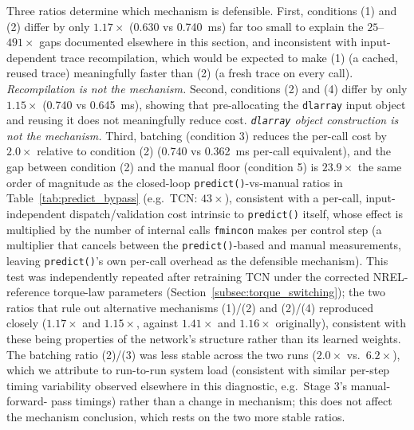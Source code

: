 Three ratios determine which mechanism is defensible. First,
conditions (1) and (2) differ by only $1.17\times$ (\SI{0.630}{} vs
\SI{0.740}{ms})  far too small to explain the $25$--$491\times$
gaps documented elsewhere in this section, and inconsistent with
input-dependent trace recompilation, which would be expected to make
(1) (a cached, reused trace) meaningfully faster than (2) (a fresh
trace on every call). \emph{Recompilation is not the mechanism.}
Second, conditions (2) and (4) differ by only $1.15\times$
(\SI{0.740}{} vs \SI{0.645}{ms}), showing that pre-allocating the
\texttt{dlarray} input object and reusing it does not meaningfully
reduce cost. \emph{\texttt{dlarray} object construction is not the
mechanism.} Third, batching (condition 3) reduces the per-call cost
by $2.0\times$ relative to condition (2) (\SI{0.740}{} vs
\SI{0.362}{ms} per-call equivalent), and the gap between condition (2)
and the manual floor (condition 5) is $23.9\times$  the same order
of magnitude as the closed-loop \texttt{predict()}-vs-manual ratios in
Table~\ref{tab:predict_bypass} (e.g.\ TCN: $43\times$), consistent
with a per-call, input-independent dispatch/validation cost intrinsic
to \texttt{predict()} itself, whose effect is multiplied by the number
of internal calls \texttt{fmincon} makes per control step (a
multiplier that cancels between the \texttt{predict()}-based and
manual measurements, leaving \texttt{predict()}'s own per-call
overhead as the defensible mechanism). This test was independently
repeated after retraining TCN under the corrected NREL-reference
torque-law parameters (Section~\ref{subsec:torque_switching}); the
two ratios that rule out alternative mechanisms (1)/(2) and (2)/(4)
reproduced closely ($1.17\times$ and $1.15\times$, against $1.41\times$
and $1.16\times$ originally), consistent with these being properties
of the network's structure rather than its learned weights. The
batching ratio (2)/(3) was less stable across the two runs
($2.0\times$ vs.\ $6.2\times$), which we attribute to run-to-run
system load (consistent with similar per-step timing variability
observed elsewhere in this diagnostic, e.g.\ Stage 3's manual-forward-
pass timings) rather than a change in mechanism; this does not affect
the mechanism conclusion, which rests on the two more stable ratios.

